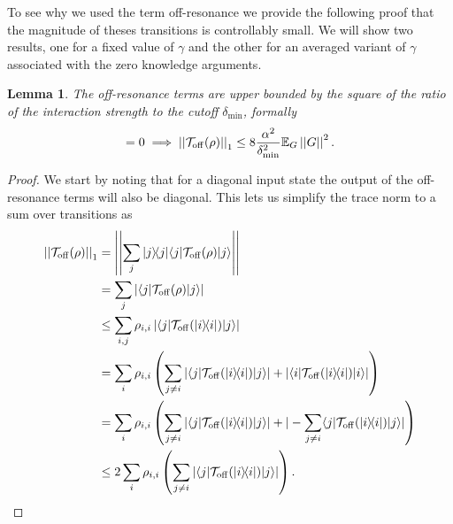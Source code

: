 \documentclass[
 amsmath,amssymb,
 aps,
onecolumn, 
nofootinbib]{revtex4-2}
\newtheorem{lemma}[theorem]{Lemma}
\newcommand{\off}{\rm off}
\newcommand{\ket}[1]{|#1\rangle}
\newcommand{\bra}[1]{\langle #1|}
\newcommand{\ketbra}[2]{| #1\rangle\! \langle #2|}
\newcommand{\abs}[1]{\left| #1 \right|}
\newcommand{\norm}[1]{\left|\left| #1 \right|\right|}
\newcommand{\EE}{\mathbb{E}}
\begin{document}
To see why we used the term off-resonance we provide the following proof that the magnitude of theses transitions is controllably small. We will show two results, one for a fixed value of $\gamma$ and the other for an averaged variant of $\gamma$ associated with the zero knowledge arguments. 


\begin{lemma}
    The off-resonance terms are upper bounded by the square of the ratio of the interaction strength to the cutoff $\delta_{\min}$, formally
    \begin{align}
        [\rho, H] = 0 \implies \norm{\mathcal{T}_{\rm off}(\rho)}_1 \le 8 \frac{\alpha^2  }{\delta_{\min}^2} \EE_G \norm{G}^2.
    \end{align}
\end{lemma}
\begin{proof}
    We start by noting that for a diagonal input state the output of the off-resonance terms will also be diagonal. This lets us simplify the trace norm to a sum over transitions as
    \begin{align}
        \norm{\mathcal{T}_{\off}(\rho)}_1 &= \norm{\sum_{j} \ketbra{j}{j} \bra{j} \mathcal{T}_{\rm off} (\rho) \ket{j}} \nonumber \\
        &=\sum_{j} \abs{\bra{j} \mathcal{T}_{\off}(\rho) \ket{j}} \\
        &\le \sum_{i, j} \rho_{i,i} \abs{\bra{j}\mathcal{T}_{\off}(\ketbra{i}{i})\ket{j}} \\
        &= \sum_{i} \rho_{i,i} \left(\sum_{j \neq i} |\bra{j} \mathcal{T}_{\off}(\ketbra{i}{i}) \ket{j}| + |\bra{i} \mathcal{T}_{\off}(\ketbra{i}{i})\ket{i}| \right) \\
        &= \sum_{i} \rho_{i,i} \left(\sum_{j \neq i} |\bra{j} \mathcal{T}_{\off}(\ketbra{i}{i}) \ket{j}| + |- \sum_{j \neq i} \bra{j} \mathcal{T}_{\off}(\ketbra{i}{i})\ket{j}| \right) \\
        &\le 2 \sum_{i} \rho_{i,i} \left(\sum_{j \neq i} |\bra{j} \mathcal{T}_{\off}(\ketbra{i}{i}) \ket{j}| \right). \label{eq:off_resonance_bound_1}
    \end{align}


\end{proof}
\end{document}
